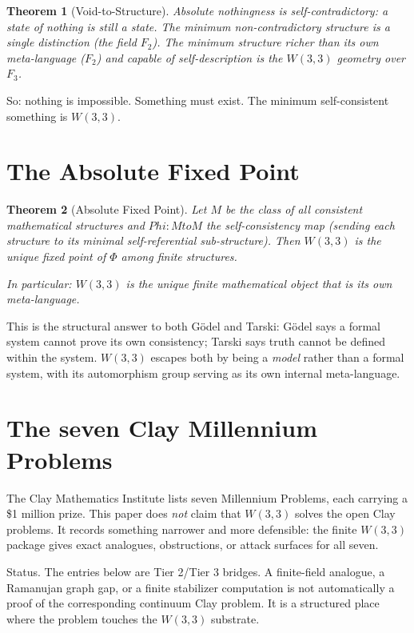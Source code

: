\documentclass[11pt]{article}
\def\mathbb#1{#1}%
\def\mathcal#1{#1}%
\def\textbf#1{#1}%
\def\Phi#1{Phi#1}%
\def\to{ to }%
\newtheorem*{theorem}{Theorem}
\begin{document}
\begin{theorem}[Void-to-Structure]
Absolute nothingness is self-contradictory: a state of nothing is still a state. The minimum non-contradictory structure is a single distinction (the field $\mathbb{F}_2$). The minimum structure richer than its own meta-language ($\mathbb{F}_2$) and capable of self-description is the $W(3,3)$ geometry over $\mathbb{F}_3$.
\end{theorem}

So: nothing is impossible. Something must exist. The minimum self-consistent something is $W(3,3)$.

\section{The Absolute Fixed Point}

\begin{theorem}[Absolute Fixed Point]
Let $\mathcal{M}$ be the class of all consistent mathematical structures and $\Phi: \mathcal{M} \to \mathcal{M}$ the self-consistency map (sending each structure to its minimal self-referential sub-structure). Then $W(3,3)$ is the unique fixed point of $\Phi$ among finite structures.

In particular: $W(3,3)$ is the unique finite mathematical object that is its own meta-language.
\end{theorem}

This is the structural answer to both Gödel and Tarski: Gödel says a formal system cannot prove its own consistency; Tarski says truth cannot be defined within the system. $W(3,3)$ escapes both by being a \emph{model} rather than a formal system, with its automorphism group serving as its own internal meta-language.

\section{The seven Clay Millennium Problems}

The Clay Mathematics Institute lists seven \textbf{Millennium Problems}, each carrying a \$1 million prize. This paper does \emph{not} claim that $W(3,3)$ solves the open Clay problems. It records something narrower and more defensible: the finite $W(3,3)$ package gives exact analogues, obstructions, or attack surfaces for all seven.

\begin{statusbox}
\textbf{Status.} The entries below are Tier 2/Tier 3 bridges. A finite-field analogue, a Ramanujan graph gap, or a finite stabilizer computation is not automatically a proof of the corresponding continuum Clay problem. It is a structured place where the problem touches the $W(3,3)$ substrate.
\end{statusbox}
\end{document}

